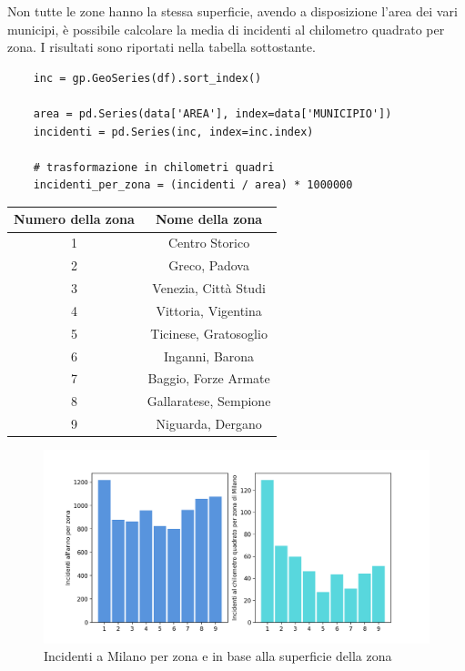 \documentclass[a4paper]{report}
\begin{document}
Non tutte le zone hanno la stessa superficie, avendo a disposizione l'area dei vari municipi, 
è possibile calcolare la media di incidenti al chilometro quadrato per zona.
I risultati sono riportati nella tabella sottostante.

\begin{lstlisting}    
    inc = gp.GeoSeries(df).sort_index()

    area = pd.Series(data['AREA'], index=data['MUNICIPIO'])
    incidenti = pd.Series(inc, index=inc.index)

    # trasformazione in chilometri quadri
    incidenti_per_zona = (incidenti / area) * 1000000 
\end{lstlisting}

\begin{center}
    \def\arraystretch{1.5}%
    \begin{tabular}{ |c|c| } 
    \hline
    Numero della zona & Nome della zona \\ 
    \hline
    \rowcolor{TableGray}
    1   &   Centro Storico\\
    2   &   Greco, Padova\\
    \rowcolor{TableGray}
    3   &   Venezia, Città Studi\\
    4   &   Vittoria, Vigentina \\
    \rowcolor{TableGray}
    5   &   Ticinese, Gratosoglio\\
    6   &   Inganni, Barona\\
    \rowcolor{TableGray}
    7   &   Baggio, Forze Armate\\
    8   &   Gallaratese, Sempione\\
    \rowcolor{TableGray}
    9   &   Niguarda, Dergano\\
    \hline
    \end{tabular}
\end{center}

\begin{figure}
    \includegraphics[width=\linewidth]{../src/municipi_milano/incidenti_superf.png}
    \caption{Incidenti a Milano per zona e in base alla superficie della zona}
    \label{fig:incidenti-chilometro}
\end{figure}
\end{document}
